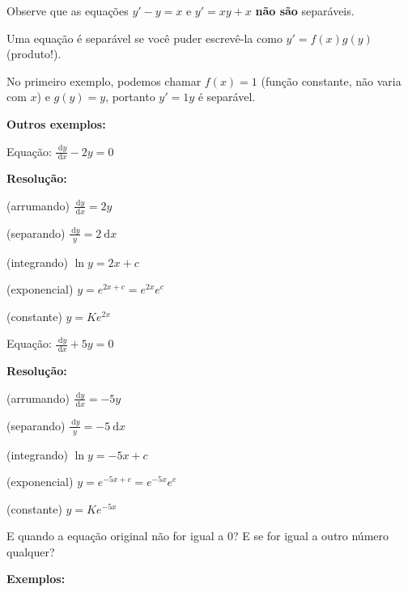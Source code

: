 \documentclass[a4paper]{article}
\newcommand{\ud}{\mathrm{\ d}}
\begin{document}
Observe que as equações $y' -y = x$ e $y' = xy + x$ {\bf não são}
separáveis.

\smallskip

Uma equação é separável se você puder escrevê-la como $y' = f(x)g(y)$
(produto!).

\smallskip

No primeiro exemplo, podemos chamar $f(x)=1$ (função constante, não
varia com $x$) e $g(y)=y$, portanto $y'=1y$ é separável.

\newpage
{\bf Outros exemplos:}

\begin{multicols}{2}

Equação: $\frac{\ud y}{\ud x} - 2y =0$

{\bf Resolução:}

(arrumando) $\frac{\ud y}{\ud x} = 2y$

(separando) $\frac{\ud y}{y} = 2\ud x$

(integrando) $\ln y = 2x +c$

(exponencial) $y = e^{2x+c}=e^{2x}e^c$

(constante) $y=Ke^{2x}$
\columnbreak

Equação: $\frac{\ud y}{\ud x}  +5y =0$

{\bf Resolução:}

(arrumando) $\frac{\ud y}{\ud x} = -5y$

(separando) $\frac{\ud y}{y} = -5\ud x$

(integrando) $\ln y = -5x +c$

(exponencial) $y = e^{-5x+c}=e^{-5x}e^c$

(constante) $y=Ke^{-5x}$

\end{multicols}

E quando a equação original não for igual a 0? E se for igual a outro
número qualquer?

{\bf Exemplos:}
\end{document}
